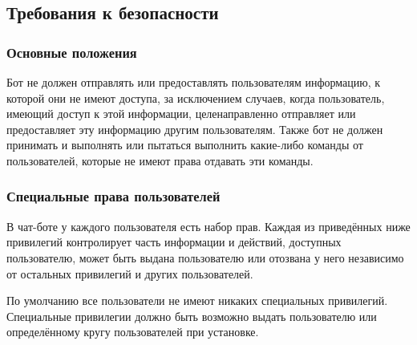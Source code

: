 \subsection{Требования к безопасности}
\label{sec:req:sec}
\subsubsection{Основные положения}
    \label{sec:req:sec:common}
    Бот не должен отправлять или предоставлять пользователям информацию,
    к которой они не имеют доступа, за исключением случаев,
    когда пользователь, имеющий доступ к этой информации, целенаправленно
    отправляет или предоставляет эту информацию другим пользователям.
    Также бот не должен принимать и выполнять или пытаться выполнить какие-либо команды от
    пользователей, которые не имеют права отдавать эти команды.

\subsubsection{Специальные права пользователей}
    \label{sec:req:sec:privs}
    В чат-боте у каждого пользователя есть набор прав. Каждая из приведённых ниже привилегий
    контролирует часть информации и действий, доступных пользователю,
    может быть выдана пользователю или отозвана у него независимо от остальных привилегий
    и других пользователей.

    По умолчанию все пользователи не имеют никаких специальных привилегий. Специальные привилегии
    должно быть возможно выдать пользователю или определённому кругу пользователей при установке.

